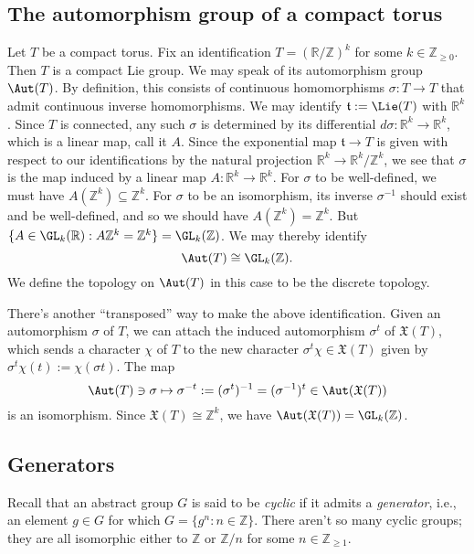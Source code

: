 \documentclass[reqno]{amsart} 
\begin{document}
\subsection{The automorphism group of a compact torus\label{sec:aut-gp-compact-torus}}
\label{sec:orgc0705cb}
Let $T$ be a compact torus.  Fix an identification $T = (\mathbb{R}/\mathbb{Z})^k$ for some $k \in \mathbb{Z}_{\geq 0}$.  Then $T$ is a compact Lie group.  We may speak of its automorphism group $\Aut(T)$.  By definition, this consists of continuous homomorphisms $\sigma : T \rightarrow T$ that admit continuous inverse homomorphisms.  We may identify $\mathfrak{t} := \Lie(T)$ with $\mathbb{R}^k$.  Since $T$ is connected, any such $\sigma$ is determined by its differential $d \sigma : \mathbb{R}^k \rightarrow \mathbb{R}^k$, which is a linear map, call it $A$.  Since the exponential map $\mathfrak{t} \rightarrow T$ is given with respect to our identifications by the natural projection $\mathbb{R}^k \rightarrow \mathbb{R}^k / \mathbb{Z}^k$, we see that $\sigma$ is the map induced by a linear map $A : \mathbb{R}^k \rightarrow \mathbb{R}^k$.  For $\sigma$ to be well-defined, we must have $A(\mathbb{Z}^k) \subseteq \mathbb{Z}^k$.  For $\sigma$ to be an isomorphism, its inverse $\sigma^{-1}$ should exist and be well-defined, and so we should have $A(\mathbb{Z}^k) = \mathbb{Z}^k$.  But $\{A \in \GL_k(\mathbb{R}) : A \mathbb{Z}^k = \mathbb{Z}^k\} = \GL_k(\mathbb{Z})$.  We may thereby identify
\begin{equation*}
  \Aut(T) \cong \GL_k(\mathbb{Z}).
\end{equation*}
We define the topology on $\Aut(T)$ in this case to be the discrete topology.

There's another ``transposed'' way to make the above identification.  Given an automorphism $\sigma$ of $T$, we can attach the induced automorphism $\sigma^t$ of $\mathfrak{X}(T)$, which sends a character $\chi$ of $T$ to the new character $\sigma^t \chi \in \mathfrak{X}(T)$ given by $\sigma^t \chi(t) := \chi(\sigma t)$.  The map
\begin{equation*}
  \Aut(T) \ni \sigma \mapsto \sigma^{-t} := (\sigma^t)^{-1} = (\sigma^{-1})^t \in \Aut(\mathfrak{X}(T))
\end{equation*}
is an isomorphism.  Since $\mathfrak{X}(T) \cong \mathbb{Z}^k$, we have $\Aut(\mathfrak{X}(T)) = \GL_k(\mathbb{Z})$.

\subsection{Generators\label{sec:gens-tori}}
\label{sec:orga53673f}
Recall that an abstract group $G$ is said to be \emph{cyclic} if it admits a \emph{generator}, i.e., an element $g \in G$ for which $G = \{g^n : n \in \mathbb{Z} \}$.  There aren't so many cyclic groups; they are all isomorphic either to $\mathbb{Z}$ or $\mathbb{Z}/n$ for some $n \in \mathbb{Z}_{\geq 1}$.
\end{document}
